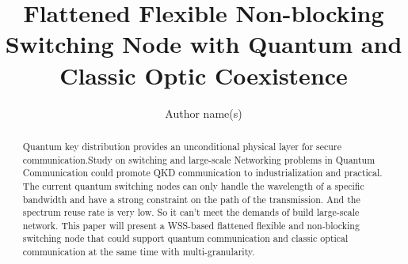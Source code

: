 \documentclass[letterpaper,10pt]{article}
\begin{document}
\title{Flattened Flexible Non-blocking Switching Node with Quantum and Classic Optic Coexistence}
\author{Author name(s)}
\address{State Key Laboratory of Information Photonics and Optical Communications, School of Information and Telecommunication Engineering, BUPT Beijing, China, 100876}

\begin{abstract}
\noindent Quantum key distribution provides an unconditional physical layer for secure communication.Study on switching and large-scale Networking problems in Quantum Communication could promote QKD communication to industrialization and practical. The current quantum switching nodes can only handle the wavelength of a specific bandwidth and have a strong constraint on the path of the transmission. And the spectrum reuse rate is very low. So it can't meet the demands of build large-scale network. This paper will present a WSS-based flattened flexible and non-blocking switching node that could support quantum communication and classic optical communication at the same time with multi-granularity.
\end{abstract}
\end{document}
